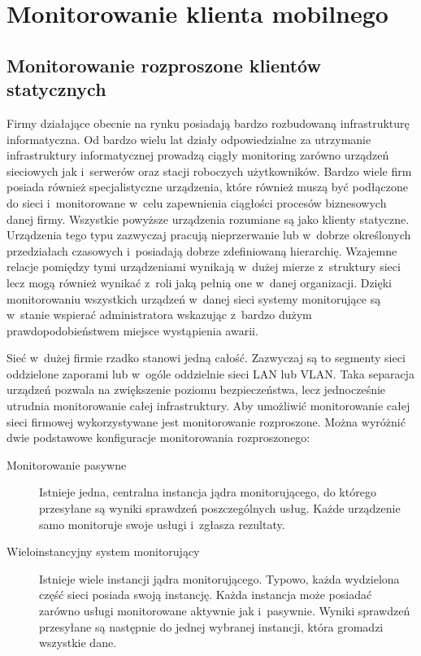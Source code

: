 \chapter{Monitorowanie klienta mobilnego}
\label{chap:Wymagania}

\section[Monitorowanie rozproszone][Monitorowanie rozproszone klientów
statycznych]{Monitorowanie rozproszone klientów statycznych}

Firmy działające obecnie na rynku posiadają bardzo rozbudowaną
infrastrukturę informatyczna. Od bardzo wielu lat działy odpowiedzialne
za utrzymanie infrastruktury informatycznej prowadzą ciągły monitoring
zarówno urządzeń sieciowych jak i~serwerów oraz stacji roboczych
użytkowników. Bardzo wiele firm posiada również specjalistyczne
urządzenia, które również muszą być podłączone do sieci i~monitorowane
w~celu zapewnienia ciągłości procesów biznesowych danej
firmy. Wszystkie powyższe urządzenia rozumiane są jako klienty
statyczne. Urządzenia tego typu zazwyczaj pracują nieprzerwanie lub
w~dobrze określonych przedziałach czasowych i~posiadają dobrze
zdefiniowaną hierarchię. Wzajemne relacje pomiędzy tymi urządzeniami
wynikają w~dużej mierze z~struktury sieci lecz mogą również wynikać
z~roli jaką pełnią one w~danej organizacji. Dzięki monitorowaniu
wszystkich urządzeń w~danej sieci systemy monitorujące są w~stanie
wspierać administratora wskazując z~bardzo dużym prawdopodobieństwem
miejsce wystąpienia awarii.

Sieć w~dużej firmie rzadko stanowi jedną całość. Zazwyczaj są to
segmenty sieci oddzielone zaporami lub w~ogóle oddzielnie sieci LAN
lub VLAN. Taka separacja urządzeń pozwala na zwiększenie poziomu
bezpieczeństwa, lecz jednocześnie utrudnia monitorowanie całej
infrastruktury. Aby umożliwić monitorowanie całej sieci firmowej
wykorzystywane jest monitorowanie rozproszone. Można wyróżnić dwie
podstawowe konfiguracje monitorowania rozproszonego:

\begin{description}
\item[Monitorowanie pasywne] Istnieje jedna, centralna instancja jądra
  monitorującego, do którego przesyłane są wyniki sprawdzeń
  poszczególnych usług. Każde urządzenie samo monitoruje swoje usługi
  i~zgłasza rezultaty.
\item[Wieloinstancyjny system monitorujący] Istnieje wiele instancji
  jądra monitorującego. Typowo, każda wydzielona część sieci posiada
  swoją instancję. Każda instancja może posiadać zarówno usługi
  monitorowane aktywnie jak i~pasywnie. Wyniki sprawdzeń przesyłane są
  następnie do jednej wybranej instancji, która gromadzi wszystkie
  dane.
\end{description}

